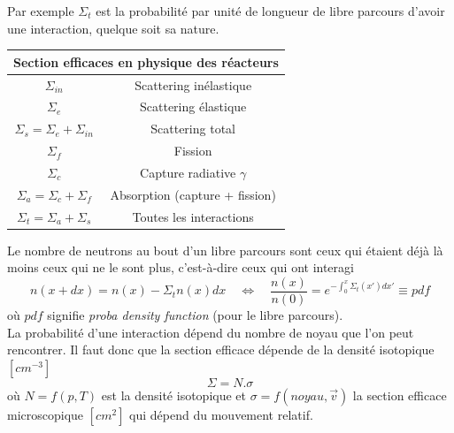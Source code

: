 Par exemple $\Sigma_t$ est la probabilité par unité de longueur de libre parcours 
d'avoir une interaction, quelque soit sa nature.
\begin{center}
\begin{tabular}{|c|c|}
\hline 
\multicolumn{2}{|c|}{Section efficaces en physique des réacteurs} \\ 
\hline 
\hline 
$\Sigma_{in}$ & Scattering inélastique \\ 
\hline 
$\Sigma_e$ & Scattering élastique \\ 
\hline 
$\Sigma_s = \Sigma_e+\Sigma_{in}$ & Scattering total \\ 
\hline 
$\Sigma_f$ & Fission \\ 
\hline 
$\Sigma_c$ & Capture radiative $\gamma$ \\ 
\hline 
$\Sigma_a=\Sigma_c+\Sigma_f$ & Absorption (capture + fission) \\ 
\hline 
$\Sigma_t=\Sigma_a+\Sigma_s$ & Toutes les interactions \\ 
\hline 
\end{tabular} 
\end{center}


Le nombre de neutrons au bout d'un libre parcours sont ceux qui étaient déjà là moins ceux qui 
ne le sont plus, c'est-à-dire ceux qui ont interagi
\begin{equation}
n(x+dx) = n(x)- \Sigma_t n(x) dx\quad \Leftrightarrow\quad \frac{n(x)}{n(0)} = e^{-\int_0^x \Sigma_t(x')dx'} \equiv pdf
\end{equation}
où $pdf$ signifie \textit{proba density function} (pour le libre parcours).\\

La probabilité d'une interaction dépend du nombre de noyau que l'on peut rencontrer. Il faut donc 
que la section efficace dépende de la densité isotopique $[cm^{-3}]$
\begin{equation}
\Sigma = N.\sigma
\end{equation}
où $N=f(p,T)$ est la densité isotopique et $\sigma = f(noyau,\vec{v})$ la section efficace 
microscopique $[cm^2]$ qui dépend du mouvement relatif.\\


